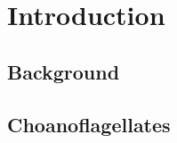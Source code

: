 
\chapter{Introduction} %

\ifpdf
    \graphicspath{{Chapter1/Figs/Raster/}{Chapter1/Figs/PDF/}{Chapter1/Figs/}}
\else
    \graphicspath{{Chapter1/Figs/Vector/}{Chapter1/Figs/}}
\fi


\section{Background} %

\begin{comment}

\nomenclature[z-cif]{$CIF$}{Cauchy's Integral Formula}                                %
\nomenclature[a-F]{$F$}{complex function}                                                   %
\nomenclature[g-p]{$\pi$}{ $\simeq 3.14\ldots$}                                             %
\nomenclature[g-i]{$\iota$}{unit imaginary number $\sqrt{-1}$}                      %
\nomenclature[g-g]{$\gamma$}{a simply closed curve on a complex plane}  %
\nomenclature[x-i]{$\oint_\gamma$}{integration around a curve $\gamma$} %
\nomenclature[r-j]{$j$}{superscript index}                                                       %
\nomenclature[s-0]{$0$}{subscript index}                                                        %
\end{comment}

\section{Choanoflagellates} %

